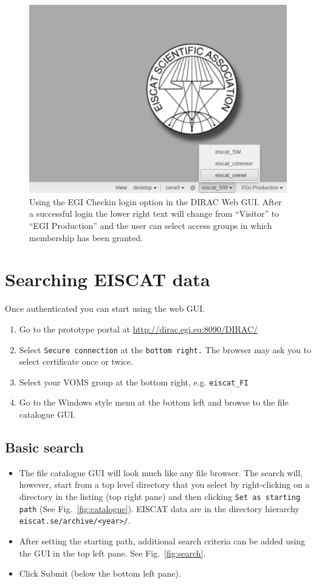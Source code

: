 \documentclass[a4paper]{article}
\begin{document}
\begin{figure}[htb]
  \centering
  \includegraphics[width=0.5\linewidth]{dirac-gui-checkin-ok}
  \caption{Using the EGI Checkin login option in the DIRAC Web GUI. After a successful login the lower right text will change from ``Visitor'' to ``EGI Production'' and the user can select access groups in which membership has been granted.}
  \label{fig:checkin-succeeded}
\end{figure}



\section{Searching EISCAT data}
\label{sec:searching}

Once authenticated you can start using the web GUI.

\begin{enumerate}
\item Go to the prototype portal at \url{http://dirac.egi.eu:8090/DIRAC/}
\item Select \texttt{Secure connection} at the \texttt{bottom right.} The browser may ask you to select certificate once or twice.
\item Select your VOMS group at the bottom right, e.g. \texttt{eiscat\_FI}
\item Go to the Windows style menu at the bottom left and browse to the file catalogue GUI. 
\end{enumerate}

\subsection{Basic search}
\label{sec:searchdir}


\begin{itemize}
\item  The file catalogue GUI will look much like any file browser. The search will, however, start from a top level directory that you select by right-clicking on a directory in the listing (top right pane) and then clicking \texttt{Set as starting path} (See Fig.~\ref{fig:catalogue}). EISCAT data are in the directory hierarchy \texttt{eiscat.se/archive/<year>/}.
\item After setting the starting path, additional search criteria can be added using the GUI in the top left pane. See Fig.~\ref{fig:search}. 
\item Click Submit (below the bottom left pane). 
\end{itemize}
\end{document}

